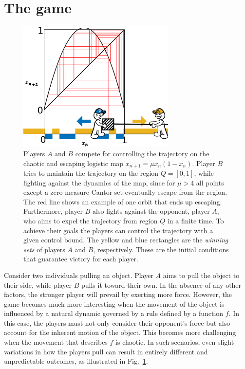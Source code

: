 \section{The game}


\begin{figure}
    \centering
    \includegraphics[width=0.7\textwidth]{Images/P5/drawing.png}
    \caption{Players $A$ and $B$ compete for controlling the trajectory on the chaotic and escaping logistic map $x_{n+1} = \mu x_n(1-x_n)$. Player $B$ tries to maintain the trajectory on the region $Q = [0,1]$, while fighting against the dynamics of the map, since for $\mu > 4$ all points except a zero measure Cantor set eventually escape from the region. The red line shows an example of one orbit that ends up escaping. Furthermore, player $B$ also fights against the opponent, player $A$, who aims to expel the trajectory from region $Q$ in a finite time. To achieve their goals the players can control the trajectory with a given control bound. The yellow and blue rectangles are the \textit{winning sets} of players $A$ and $B$, respectively. These are the initial conditions that guarantee victory for each player.}
    \label{fig:drawing}
\end{figure}



Consider two individuals pulling an object. Player $A$ aims to pull the object to their side, while player $B$ pulls it toward their own. In the absence of any other factors, the stronger player will prevail by exerting more force. However, the game becomes much more interesting when the movement of the object is influenced by a natural dynamic governed by a rule defined by a function $f$. In this case, the players must not only consider their opponent's force but also account for the inherent motion of the object. This becomes more challenging when the movement that describes $f$ is chaotic. In such scenarios, even slight variations in how the players pull can result in entirely different and unpredictable outcomes, as illustrated in Fig.~\ref{fig:drawing}.  



